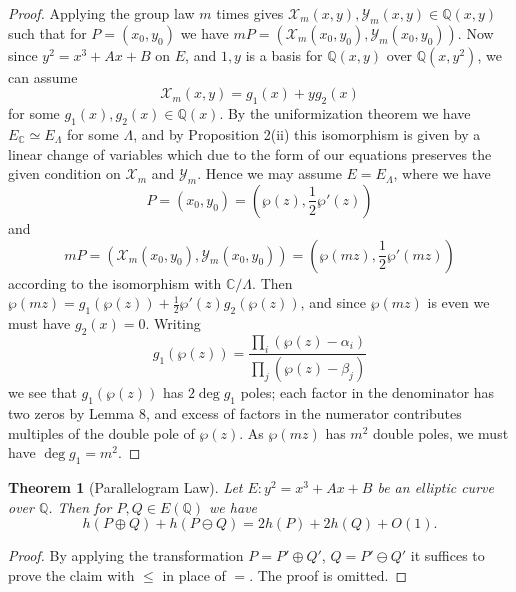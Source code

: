 \documentclass[a4paper]{article}
\newtheorem{theorem}{Theorem}
\theoremstyle{definition}
\newcommand{\X}{\mathcal{X}}
\newcommand{\Y}{\mathcal{Y}}
\newcommand{\Q}{\mathbb{Q}}
\newcommand{\C}{\mathbb{C}}
\begin{document}
\begin{proof}
    Applying the group law $m$ times gives $\X_m(x,y),\Y_m(x,y)\in\Q(x,y)$ such
    that for $P=(x_0,y_0)$ we have $mP=(\X_m(x_0,y_0),\Y_m(x_0,y_0))$. Now since
    $y^2=x^3+Ax+B$ on $E$, and $1,y$ is a basis for $\Q(x,y)$ over $\Q(x,y^2)$,
    we can assume
    \begin{equation*}
        \X_m(x,y) = g_1(x) + yg_2(x)
    \end{equation*}
    for some $g_1(x),g_2(x)\in\Q(x)$. By the uniformization theorem we have
    $E_\C\simeq E_\Lambda$ for some $\Lambda$, and by Proposition 2(ii) this
    isomorphism is given by a linear change of variables which due to the form
    of our equations preserves the given condition on $\X_m$ and $\Y_m$. Hence
    we may assume $E=E_\Lambda$, where we have
    \begin{equation*}
        P = (x_0,y_0) = (\wp(z),\frac{1}{2}\wp'(z))
    \end{equation*}
    and
    \begin{equation*}
        mP = (\X_m(x_0,y_0),\Y_m(x_0,y_0)) = (\wp(mz),\frac{1}{2}\wp'(mz))
    \end{equation*}
    according to the isomorphism with $\C/\Lambda$. Then
    $\wp(mz)=g_1(\wp(z))+\frac{1}{2}\wp'(z)g_2(\wp(z))$, and since
    $\wp(mz)$ is even we must have $g_2(x)=0$. Writing
    \begin{equation*}
        g_1(\wp(z)) = \frac{\prod_i(\wp(z)-\alpha_i)}{\prod_j(\wp(z)-\beta_j)}
    \end{equation*}
    we see that $g_1(\wp(z))$ has $2\deg g_1$ poles; each factor in the
    denominator has two zeros by Lemma 8, and excess of factors in the numerator
    contributes multiples of the double pole of $\wp(z)$. As $\wp(mz)$ has $m^2$
    double poles, we must have $\deg g_1=m^2$.
\end{proof}

\begin{theorem}[Parallelogram Law]
    Let $E:y^2=x^3+Ax+B$ be an elliptic curve over $\Q$. Then for $P,Q\in E(\Q)$
    we have
    \begin{equation*}
        h(P\oplus Q) + h(P\ominus Q) = 2h(P) + 2h(Q) + O(1).
    \end{equation*}
\end{theorem}

\begin{proof}
    By applying the transformation $P=P'\oplus Q'$, $Q=P'\ominus Q'$ it suffices
    to prove the claim with $\le$ in place of $=$. The proof is omitted.
\end{proof}
\end{document}
